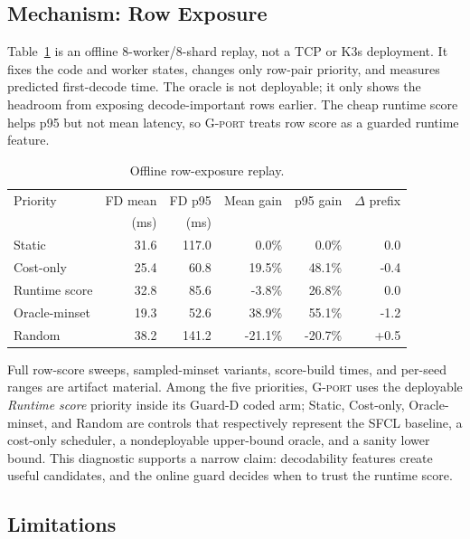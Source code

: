 \subsection{Mechanism: Row Exposure}

Table~\ref{tab:score-diagnostic} is an offline 8-worker/8-shard replay, not a
TCP or K3s deployment.  It fixes the code and worker states, changes only
row-pair priority, and measures predicted first-decode time.  The oracle is not
deployable; it only shows the headroom from exposing decode-important rows
earlier.  The cheap runtime score helps p95 but not mean latency, so
\textsc{G-port} treats row score as a guarded runtime feature.

\begin{table}[t]
  \centering
  \setlength{\tabcolsep}{1.0pt}
  \caption{Offline row-exposure replay.}
  \label{tab:score-diagnostic}
  \begin{tabular}{@{}lrrrrr@{}}
    \toprule
    Priority & FD mean & FD p95 & Mean gain & p95 gain & $\Delta$ prefix \\
             & (ms) & (ms) & & & \\
    \midrule
    Static & 31.6 & 117.0 & 0.0\% & 0.0\% & 0.0 \\
    Cost-only & 25.4 & 60.8 & 19.5\% & 48.1\% & -0.4 \\
    Runtime score & 32.8 & 85.6 & -3.8\% & 26.8\% & 0.0 \\
    Oracle-minset & 19.3 & 52.6 & 38.9\% & 55.1\% & -1.2 \\
    Random & 38.2 & 141.2 & -21.1\% & -20.7\% & +0.5 \\
    \bottomrule
  \end{tabular}
\end{table}

Full row-score sweeps, sampled-minset variants, score-build times, and per-seed
ranges are artifact material.  Among the five priorities, \textsc{G-port} uses
the deployable \emph{Runtime score} priority inside its Guard-D coded arm; Static,
Cost-only, Oracle-minset, and Random are controls that respectively represent
the SFCL baseline, a cost-only scheduler, a nondeployable upper-bound oracle, and
a sanity lower bound.  This diagnostic supports a narrow claim: decodability
features create useful candidates, and the online guard decides when to trust the
runtime score.

\subsection{Limitations}

